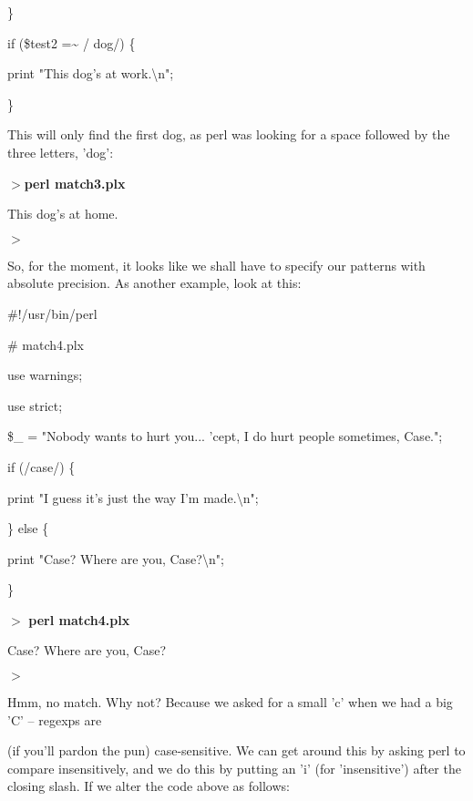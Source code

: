 \documentclass[a4paper,11pt]{book}
\begin{document}
\noindent \}

\noindent 

\noindent if (\$test2 =\~{} / dog/) \{

\noindent print "This dog's at work.\textbackslash n";

\noindent \}

\noindent 

\noindent This will only find the first dog, as perl was looking for a space followed by the three letters, 'dog':

\noindent 

\noindent $>$\textbf{perl match3.plx}

\noindent This dog's at home.

\noindent $>$

\noindent 

\noindent So, for the moment, it looks like we shall have to specify our patterns with absolute precision. As another example, look at this:

\noindent 

\noindent \#!/usr/bin/perl

\noindent \# match4.plx

\noindent use warnings;

\noindent use strict;

\noindent 

\noindent 

\noindent \$\_  = "Nobody wants to hurt you... 'cept, I do hurt people sometimes, Case.";

\noindent if (/case/) \{

\noindent print "I guess it's just the way I'm made.\textbackslash n";

\noindent \} else \{

\noindent print "Case? Where are you, Case?\textbackslash n";

\noindent \}

\noindent 

\noindent $>$ \textbf{perl match4.plx}

\noindent Case? Where are you, Case?

\noindent $>$

\noindent 

\noindent Hmm,  no  match.  Why not?  Because  we asked  for  a  small  'c'  when we  had a  big 'C'  --  regexps  are

\noindent (if you'll  pardon the  pun)  case-sensitive.  We can  get  around  this  by  asking  perl  to  compare insensitively,  and we do  this  by  putting  an  'i'  (for  'insensitive')  after  the closing  slash.  If  we  alter the code above as follows:
\end{document}
